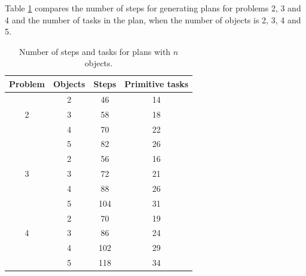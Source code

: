 \documentclass{beamer}
\begin{document}
	
	\begin{frame}
			Table \ref{table:n-objects} compares the number of steps for generating plans for problems 2, 3 and 4 and the number of tasks in the plan, when the number of objects is 2, 3, 4 and 5.
			
	\begin{table}[h!]
		
		\centering
		\scriptsize
		
		\begin{tabular}{cccc}
			\toprule
			
			Problem & Objects & Steps  & Primitive tasks\\
			\midrule
			
			\multirow{3}{*}[-3pt]{2} & {2} & {46} & {14} \\
			
			{} & {3} & {58} & {18} \\
			
			{} & {4} & {70} & {22} \\
			
			{} & {5} & {82} & {26} \\
			
			\midrule
			
			\multirow{3}{*}[-3pt]{3} & {2} & {56} & {16} \\
			
			{} & {3} & {72} & {21} \\
			
			{} & {4} & {88} & {26} \\
			
			{} & {5} & {104} & {31} \\
			
			\midrule
			
			\multirow{3}{*}[-3pt]{4} & {2} & {70} & {19} \\
			
			{} & {3} & {86} & {24} \\
			
			{} & {4} & {102} & {29} \\
			
			{} & {5} & {118} & {34} \\
			
			\bottomrule
		\end{tabular}
		\caption{Number of steps and tasks for plans with $n$ objects.}
		\label{table:n-objects}
	\end{table}
			
	\end{frame}
	
\end{document}
